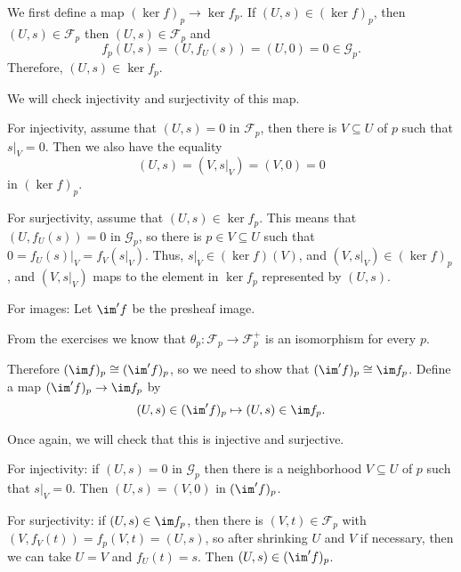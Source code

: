 We first define a map $(\ker f)_p \to \ker f_p$. If $(U, s) \in (\ker f)_p$, then
$(U, s) \in \mathcal{F}_p$ then $(U, s) \in \mathcal{F}_p$ and
\[ f_p(U, s) = (U, f_U(s)) = (U, 0) = 0 \in \mathcal{G}_p. \]
Therefore, $(U, s) \in \ker f_p$.

We will check injectivity and surjectivity of this map.

For injectivity, assume that $(U, s) = 0$ in $\mathcal{F}_p$, then there is
$V \subseteq U$ of $p$ such that $s|_V = 0$. Then we also have the equality
\[ (U, s) = (V, s|_V) = (V, 0) = 0 \]
in  $(\ker f)_p$.

For surjectivity, assume that $(U, s) \in \ker f_p$. This means that
 $(U, f_U(s)) = 0$ in $\mathcal{G}_p$, so there is $p \in V \subseteq U$ such
 that $0 = f_U(s)|_V = f_V(s|_V)$. Thus, $s|_V \in (\ker f)(V)$, and
 $(V, s|_V) \in (\ker f)_p$, and $(V, s|_V)$ maps to the element in $\ker f_p$
 represented by $(U, s)$.

For images: Let $\im' f$ be the presheaf image.

From the exercises we know that $\theta_p\colon \mathcal{F}_p \to \mathcal{F}^+_p$ is
an isomorphism for every $p$.

Therefore $(\im f)_p \cong (\im' f)_p$, so we need to show that
$(\im' f)_p \cong \im f_p$. Define a map
$(\im' f)_p \to \im f_p$ by
\[ (U, s)  \in (\im' f)_p \mapsto (U, s) \in \im f_p. \]

Once again, we will check that this is injective and surjective.

For injectivity: if $(U, s) = 0$ in $\mathcal{G}_p$ then there is a neighborhood
$V \subseteq U$ of $p$ such that $s|_V = 0$. Then $(U, s) = (V, 0)$ in $(\im' f)_p$.

For surjectivity: if $(U, s) \in \im f_p$, then there is
$(V, t) \in \mathcal{F}_p$ with $(V, f_V(t)) = f_p(V, t) = (U, s)$, so after
shrinking $U$ and $V$ if necessary, then we can take $U = V$ and
$f_U(t) = s$. Then $(U, s) \in (\im' f)_p$.
